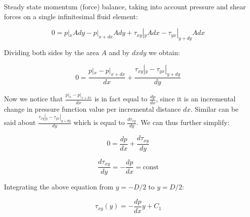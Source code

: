 Steady state momentum (force) balance, taking into account pressure and shear forces on a single infinitesimal fluid element:

\begin{equation}
0 = p|_x A dy - p|_{x+dx} A dy + \tau_{xy}|_y A dx - \tau_{yx}|_{y+dy} A dx
\end{equation}

Dividing both sides by the area $A$ and by $dx dy$ we obtain:

\begin{equation}
0 = \frac{p|_x  - p|_{x+dx}}{dx}  + \frac{\tau_{xy}|_y  - \tau_{yx}|_{y+dy}}{dy} 
\end{equation}

Now we notice that $\frac{p|_x  - p|_{x+dx}}{dx}$ is in fact equal to $\frac{dp}{dx}$, since it is an incremental change in pressure function value per incremental distance $dx$. Similar can be said about $\frac{\tau_{xy}|_y  - \tau_{yx}|_{y+dy}}{dy}$ which is equal to $\frac{d \tau_{xy}}{dy}$. We can thus further simplify:

\begin{equation}
0 = \frac{dp}{dx}  + \frac{d \tau_{xy}}{dy}
\end{equation}

\begin{equation}
\frac{d \tau_{xy}}{dy} = - \frac{dp}{dx} = \text{const}
\end{equation}

Integrating the above equation from $y = -D/2$ to $y = D/2$:

\begin{equation}
\tau_{xy}(y)= - \frac{dp}{dx} y + C_1
\end{equation}



